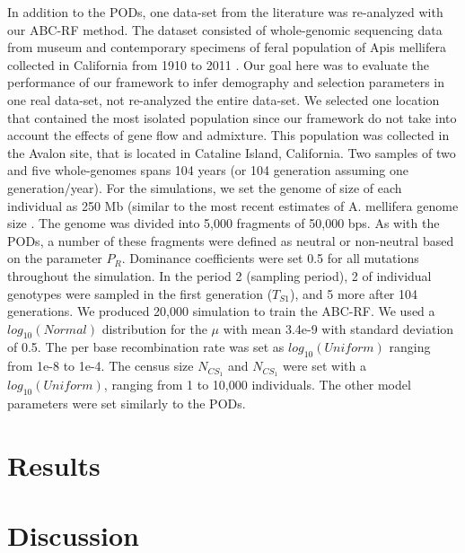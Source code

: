 \documentclass[12pt]{article}
\begin{document}
In addition to the PODs,  one data-set from the literature was re-analyzed with our ABC-RF method. The dataset consisted of whole-genomic sequencing data from museum and contemporary specimens of feral population of Apis mellifera collected in California from 1910 to 2011 \citep{Cridland:2018fx}. Our goal here was to evaluate the performance of our framework to infer demography and selection parameters in one real data-set, not re-analyzed the entire data-set. We selected one location that contained the most isolated population since our framework do not take into account the effects of gene flow and admixture. This population was collected in the Avalon site, that is located in Cataline Island, California. Two samples of two and five whole-genomes spans 104 years (or 104 generation assuming one generation/year). For the simulations, we set the genome of size of each individual as 250 Mb (similar to the most recent estimates of A. mellifera genome size \citep{Elsik:2014hf}. The genome was divided into 5,000 fragments of 50,000 bps. As with the PODs, a number of these fragments were defined as neutral or non-neutral based on the parameter $P_{R}$. Dominance coefficients were set 0.5 for all mutations throughout the simulation. In the period 2 (sampling period), 2 of individual genotypes were sampled in the first generation ($T_{S1}$), and 5 more after 104 generations. We produced 20,000 simulation to train the ABC-RF. We used a $log_{10}(Normal)$ distribution for the $\mu$ with mean 3.4e-9 with standard deviation of 0.5. The per base recombination rate was set as $log_{10}(Uniform)$ ranging from 1e-8 to 1e-4. The census size $N_{CS_{1}}$ and $N_{CS_{1}}$ were set with a $log_{10}(Uniform)$, ranging from 1 to 10,000 individuals. The other model parameters were set similarly to the PODs.

\section*{Results}
\section*{Discussion}
\end{document}
